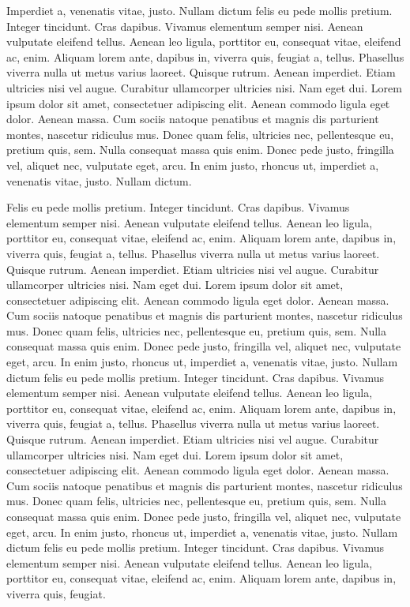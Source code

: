 \documentclass[
    12pt,
    letterpaper,
    oneside,
    noraggedright
]{turabian-researchpaper}
\begin{document}
Imperdiet a, venenatis vitae, justo. Nullam dictum felis eu pede mollis
pretium. Integer tincidunt. Cras dapibus. Vivamus elementum semper nisi.
Aenean vulputate eleifend tellus. Aenean leo ligula, porttitor eu,
consequat vitae, eleifend ac, enim. Aliquam lorem ante, dapibus in,
viverra quis, feugiat a, tellus. Phasellus viverra nulla ut metus varius
laoreet. Quisque rutrum. Aenean imperdiet. Etiam ultricies nisi vel
augue. Curabitur ullamcorper ultricies nisi. Nam eget dui. Lorem ipsum
dolor sit amet, consectetuer adipiscing elit. Aenean commodo ligula eget
dolor. Aenean massa. Cum sociis natoque penatibus et magnis dis
parturient montes, nascetur ridiculus mus. Donec quam felis, ultricies
nec, pellentesque eu, pretium quis, sem. Nulla consequat massa quis
enim. Donec pede justo, fringilla vel, aliquet nec, vulputate eget,
arcu. In enim justo, rhoncus ut, imperdiet a, venenatis vitae, justo.
Nullam dictum.

Felis eu pede mollis pretium. Integer tincidunt. Cras dapibus. Vivamus
elementum semper nisi. Aenean vulputate eleifend tellus. Aenean leo
ligula, porttitor eu, consequat vitae, eleifend ac, enim. Aliquam lorem
ante, dapibus in, viverra quis, feugiat a, tellus. Phasellus viverra
nulla ut metus varius laoreet. Quisque rutrum. Aenean imperdiet. Etiam
ultricies nisi vel augue. Curabitur ullamcorper ultricies nisi. Nam eget
dui. Lorem ipsum dolor sit amet, consectetuer adipiscing elit. Aenean
commodo ligula eget dolor. Aenean massa. Cum sociis natoque penatibus et
magnis dis parturient montes, nascetur ridiculus mus. Donec quam felis,
ultricies nec, pellentesque eu, pretium quis, sem. Nulla consequat massa
quis enim. Donec pede justo, fringilla vel, aliquet nec, vulputate eget,
arcu. In enim justo, rhoncus ut, imperdiet a, venenatis vitae, justo.
Nullam dictum felis eu pede mollis pretium. Integer tincidunt. Cras
dapibus. Vivamus elementum semper nisi. Aenean vulputate eleifend
tellus. Aenean leo ligula, porttitor eu, consequat vitae, eleifend ac,
enim. Aliquam lorem ante, dapibus in, viverra quis, feugiat a, tellus.
Phasellus viverra nulla ut metus varius laoreet. Quisque rutrum. Aenean
imperdiet. Etiam ultricies nisi vel augue. Curabitur ullamcorper
ultricies nisi. Nam eget dui. Lorem ipsum dolor sit amet, consectetuer
adipiscing elit. Aenean commodo ligula eget dolor. Aenean massa. Cum
sociis natoque penatibus et magnis dis parturient montes, nascetur
ridiculus mus. Donec quam felis, ultricies nec, pellentesque eu, pretium
quis, sem. Nulla consequat massa quis enim. Donec pede justo, fringilla
vel, aliquet nec, vulputate eget, arcu. In enim justo, rhoncus ut,
imperdiet a, venenatis vitae, justo. Nullam dictum felis eu pede mollis
pretium. Integer tincidunt. Cras dapibus. Vivamus elementum semper nisi.
Aenean vulputate eleifend tellus. Aenean leo ligula, porttitor eu,
consequat vitae, eleifend ac, enim. Aliquam lorem ante, dapibus in,
viverra quis, feugiat.
\end{document}
